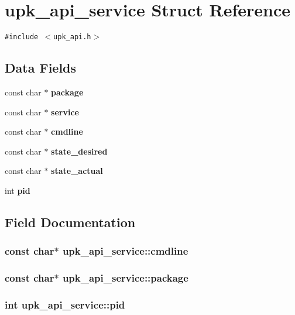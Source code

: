 \section{upk\_\-api\_\-service Struct Reference}
\label{structupk__api__service}
{\tt \#include $<$upk\_\-api.h$>$}

\subsection*{Data Fields}
\begin{CompactItemize}
\item 
const char $\ast$ \bf{package}
\item 
const char $\ast$ \bf{service}
\item 
const char $\ast$ \bf{cmdline}
\item 
const char $\ast$ \bf{state\_\-desired}
\item 
const char $\ast$ \bf{state\_\-actual}
\item 
int \bf{pid}
\end{CompactItemize}


\subsection{Field Documentation}
\subsubsection{\setlength{\rightskip}{0pt plus 5cm}const char$\ast$ \bf{upk\_\-api\_\-service::cmdline}}\label{structupk__api__service_36e6e88876ba9e61324819746516d611}


\subsubsection{\setlength{\rightskip}{0pt plus 5cm}const char$\ast$ \bf{upk\_\-api\_\-service::package}}\label{structupk__api__service_043d232f199a1ffd712987a6a1cf0b44}


\subsubsection{\setlength{\rightskip}{0pt plus 5cm}int \bf{upk\_\-api\_\-service::pid}}\label{structupk__api__service_4e66af1139794b0ccc0be3f907f17bb1}


